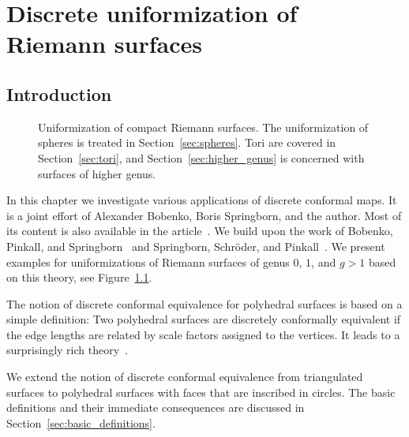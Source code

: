\documentclass[Thesis]{subfiles}
\begin{document}

\chapter{Discrete uniformization of Riemann surfaces}
\label{chp:uniformization}

\section{Introduction}

\begin{figure}
\centering
{}
\caption{
Uniformization of compact Riemann surfaces. 
The uniformization of spheres is treated in
Section~\ref{sec:spheres}. Tori are covered in
Section~\ref{sec:tori}, and Section~\ref{sec:higher_genus} is
concerned with surfaces of higher genus.
}
\label{fig:intro_uniformization}
\end{figure}

In this chapter we investigate various applications of discrete conformal maps. 
It is a joint effort of Alexander Bobenko, Boris Springborn, and the author. Most of its content is also available in the article~\cite{BobSechSpr}.
We build upon the work of Bobenko, Pinkall, and Springborn~\cite{BPS2015:dconf} and Springborn, Schr\"{o}der, and Pinkall~\cite{Springborn2008}. 
We present examples for uniformizations of Riemann surfaces of genus $0$, $1$, and $g>1$ based on this theory, see Figure~\ref{fig:intro_uniformization}.

The notion of discrete conformal equivalence for polyhedral surfaces
is based on a simple definition: Two polyhedral surfaces are
discretely conformally equivalent if the edge lengths are related by
scale factors assigned to the vertices. It leads to a surprisingly
rich theory~\cite{Luo2004:Yamabe, BPS2015:dconf, Luo-Uniformization, Luo-Uniformization_II}.

We extend the notion of discrete conformal equivalence from
triangulated surfaces to polyhedral surfaces with faces that are
inscribed in circles. The basic definitions and their immediate
consequences are discussed in Section~\ref{sec:basic_definitions}. 
\end{document}
